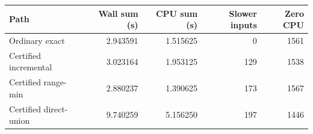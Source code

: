 \begin{tabular}{@{}lrrrr@{}}
\toprule
Path & Wall sum (s) & CPU sum (s) & Slower inputs & Zero CPU \\
\midrule
Ordinary exact & 2.943591 & 1.515625 & 0 & 1561 \\
Certified incremental & 3.023164 & 1.953125 & 129 & 1538 \\
Certified range-min & 2.880237 & 1.390625 & 173 & 1567 \\
Certified direct-union & 9.740259 & 5.156250 & 197 & 1446 \\
\bottomrule
\end{tabular}
